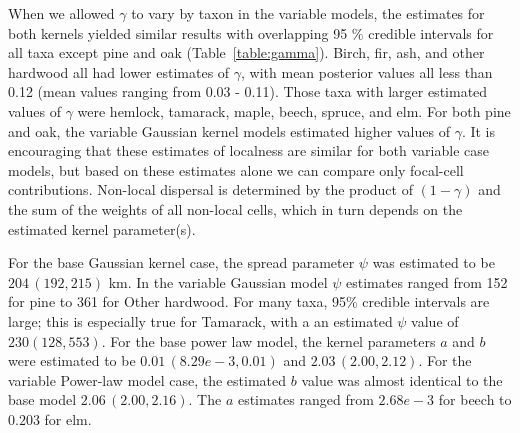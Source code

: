 \documentclass[12pt]{article}
\begin{document}
When we allowed $\gamma$ to vary by taxon in the variable models, the
estimates for both kernels yielded similar results with overlapping 95
\% credible intervals for all taxa except pine and oak
(Table~\ref{table:gamma}). Birch, fir, ash, and other
hardwood all had lower estimates of $\gamma$, with mean posterior
values all less than 0.12 (mean values ranging from 0.03 -
0.11). Those taxa with larger estimated values of $\gamma$ were
hemlock, tamarack, maple, beech, spruce, and elm. For both pine and
oak, the variable Gaussian kernel models estimated higher values of
$\gamma$. It is encouraging that these estimates of localness are
similar for both variable case models, but based on these estimates
alone we can compare only focal-cell contributions. Non-local
dispersal is determined by the product of $(1-\gamma)$ and the sum of
the weights of all non-local cells, which in turn depends on the
estimated kernel parameter(s).

For the base Gaussian kernel case, the spread parameter $\psi$ was
estimated to be $204\,(192, 215)$ km. In the variable Gaussian model
$\psi$ estimates ranged from 152 for pine to 361 for Other
hardwood. For many taxa, 95\% credible intervals are large; this is
especially true for Tamarack, with a an estimated $\psi$ value of $230
(128, 553)$. For the base power law model, the kernel parameters $a$
and $b$ were estimated to be $0.01\,(8.29e-3, 0.01)$ and $2.03\,(2.00,
2.12)$. For the variable Power-law model case, the estimated $b$ value
was almost identical to the base model $2.06\,(2.00, 2.16)$. The $a$
estimates ranged from $2.68e-3$ for beech to $0.203$ for elm.
\end{document}
